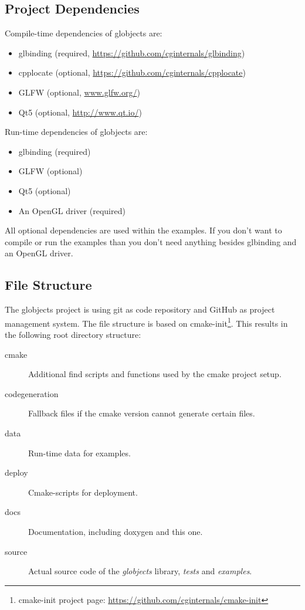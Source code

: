 \documentclass{article}
\begin{document}
\subsection{Project Dependencies}

Compile-time dependencies of globjects are:
\begin{itemize}
	\item glbinding (required, \url{https://github.com/cginternals/glbinding})
	\item cpplocate (optional, \url{https://github.com/cginternals/cpplocate})
	\item GLFW (optional, \url{www.glfw.org/})
	\item Qt5 (optional, \url{http://www.qt.io/})
\end{itemize}

Run-time dependencies of globjects are:
\begin{itemize}
	\item glbinding (required)
	\item GLFW (optional)
	\item Qt5 (optional)
	\item An OpenGL driver (required)
\end{itemize}

\noindent All optional dependencies are used within the examples. If you don't want to compile or run the examples than you don't need anything besides glbinding and an OpenGL driver.

\subsection{File Structure}

The globjects project is using git as code repository and GitHub as project management system. The file structure is based on cmake-init\footnote{cmake-init project page: \url{https://github.com/cginternals/cmake-init}}. This results in the following root directory structure:
\begin{description}
	\item[cmake] Additional find scripts and functions used by the cmake project setup.
	\item[codegeneration] Fallback files if the cmake version cannot generate certain files.
	\item[data] Run-time data for examples.
	\item[deploy] Cmake-scripts for deployment.
	\item[docs] Documentation, including doxygen and this one.
	\item[source] Actual source code of the \emph{globjects} library, \emph{tests} and \emph{examples}.
\end{description}
\end{document}
